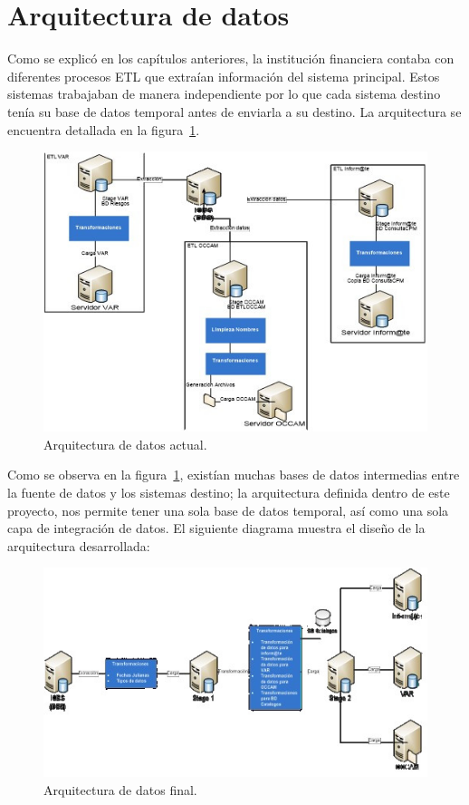 {\begin{enumerate}
\end{enumerate}


\section{Arquitectura de datos}

Como se explicó en los capítulos anteriores, la institución financiera contaba
con diferentes procesos ETL que extraían información del sistema
principal. Estos sistemas trabajaban de manera independiente por lo que cada
sistema destino tenía su base de datos temporal antes de enviarla a su
destino. La arquitectura se encuentra detallada en la
figura~\ref{fig:arquitectura-de-datos-actual}.

\begin{figure}[htb]
  \begin{center}
    \includegraphics[width=0.8\linewidth]{Arquitecturadatos_actual.jpg}
    \caption{Arquitectura de datos actual.}
    \label{fig:arquitectura-de-datos-actual}
  \end{center}
\end{figure}

Como se observa en la figura~\ref{fig:arquitectura-de-datos-actual}, existían
muchas bases de datos intermedias entre la fuente de datos y los sistemas
destino; la arquitectura definida dentro de este proyecto, nos permite tener una
sola base de datos temporal, así como una sola capa de integración de datos. El
siguiente diagrama muestra el diseño de la arquitectura desarrollada:

\begin{figure}[htb]
  \begin{center}
    \includegraphics[width=0.8\linewidth]{Arquitectura_final.jpg}
    \caption{Arquitectura de datos final.}
    \label{fig:arquitectura-de-datos-final}
  \end{center}
\end{figure}

}
